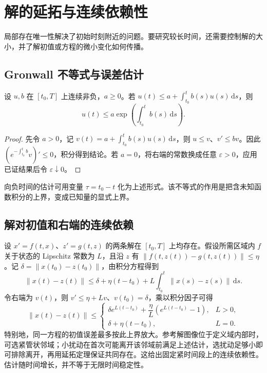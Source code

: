 \setcounter{chapter}{4} %
\chapter{解的延拓与连续依赖性}
\label{chap:ode-dependence}

局部存在唯一性解决了初始时刻附近的问题。要研究较长时间，还需要控制解的大小，并了解初值或方程的微小变化如何传播。

\section{Gronwall 不等式与误差估计}
\begin{theorem}
\label{thm:ode-gronwall}
设 $u,b$ 在 $[t_0,T]$ 上连续非负，$a\geq0$。若 $u(t)\leq a+\int_{t_0}^t b(s)u(s)\,\mathrm ds$，则
\[
 u(t)\leq a\exp\!\left(\int_{t_0}^t b(s)\,\mathrm ds\right).
\]
\end{theorem}
\begin{proof}
先令 $a>0$，记 $v(t)=a+\int_{t_0}^t b(s)u(s)\,\mathrm ds$，则 $u\leq v$、$v'\leq bv$。因此 $(e^{-\int_{t_0}^t b}v)'\leq0$，积分得到结论。若 $a=0$，将右端的常数换成任意 $\varepsilon>0$，应用已证结果后令 $\varepsilon\downarrow0$。
\end{proof}

向负时间的估计可用变量 $\tau=t_0-t$ 化为上述形式。该不等式的作用是把含未知函数积分的上界，变成已知量的显式上界。

\section{解对初值和右端的连续依赖}
设 $x'=f(t,x)$、$z'=g(t,z)$ 的两条解在 $[t_0,T]$ 上均存在。假设所需区域内 $f$ 关于状态的 Lipschitz 常数为 $L$，且沿 $z$ 有 $\|f(t,z(t))-g(t,z(t))\|\leq\eta$。记 $\delta=\|x(t_0)-z(t_0)\|$，由积分方程得到
\[
 \|x(t)-z(t)\|\leq\delta+\eta(t-t_0)+L\int_{t_0}^t\|x(s)-z(s)\|\,\mathrm ds.
\]
令右端为 $v(t)$，则 $v'\leq\eta+Lv$、$v(t_0)=\delta$，乘以积分因子可得
\begin{equation}
 \|x(t)-z(t)\|\leq
 \begin{cases}
 \delta e^{L(t-t_0)}+\dfrac{\eta}{L}(e^{L(t-t_0)}-1),&L>0,\\
 \delta+\eta(t-t_0),&L=0.
 \end{cases}
 \label{eq:ode-dependence-bound}
\end{equation}
特别地，同一方程的初值误差最多按此上界放大。参考解图像位于定义域内部时，可选紧管状邻域；小扰动在首次可能离开该邻域前满足上述估计，选扰动足够小即可排除离开，再用延拓定理保证共同存在。这给出固定紧时间段上的连续依赖性。估计随时间增长，并不等于无限时间稳定性。

